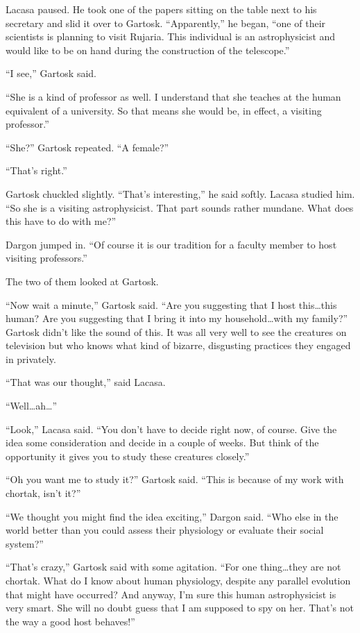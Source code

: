 Lacasa paused. He took one of the papers sitting on the table next to his secretary and slid it
over to Gartosk. ``Apparently,'' he began, ``one of their scientists is planning to visit
Rujaria. This individual is an astrophysicist and would like to be on hand during the
construction of the telescope.''

``I see,'' Gartosk said.

``She is a kind of professor as well. I understand that she teaches at the human equivalent of
a university. So that means she would be, in effect, a visiting professor.''

``She?'' Gartosk repeated. ``A female?''

``That's right.''

Gartosk chuckled slightly. ``That's interesting,'' he said softly. Lacasa studied him.
``So she is a visiting astrophysicist. That part sounds rather mundane. What does this have to
do with me?''

Dargon jumped in. ``Of course it is our tradition for a faculty member to host visiting
professors.''

The two of them looked at Gartosk.

``Now wait a minute,'' Gartosk said. ``Are you suggesting that I host this\ldots this human?
Are you suggesting that I bring it into my household\ldots with my family?'' Gartosk didn't
like the sound of this. It was all very well to see the creatures on television but who knows
what kind of bizarre, disgusting practices they engaged in privately.

``That was our thought,'' said Lacasa.

``Well\ldots ah\ldots''

``Look,'' Lacasa said. ``You don't have to decide right now, of course. Give the idea
some consideration and decide in a couple of weeks. But think of the opportunity it gives you to
study these creatures closely.''

``Oh you want me to study it?'' Gartosk said. ``This is because of my work with chortak,
isn't it?''

``We thought you might find the idea exciting,'' Dargon said. ``Who else in the world
better than you could assess their physiology or evaluate their social system?''

``That's crazy,'' Gartosk said with some agitation. ``For one thing\ldots they are not
chortak. What do I know about human physiology, despite any parallel evolution that might have
occurred? And anyway, I'm sure this human astrophysicist is very smart. She will no doubt
guess that I am supposed to spy on her. That's not the way a good host behaves!''

